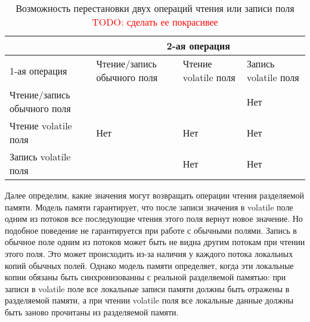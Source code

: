 \documentclass[14pt,titlepage]{extarticle}
\newcommand{\todo}[1]{\textcolor{red}{\eng{TODO}: #1}}
\newcommand{\eng}[1]{{\English#1}}
\begin{document}
      \begin{table}[!htb]
        \centering
        \begin{tabular}{ |p{}|p{}|p{}|p{}| }
          \hline
          & \multicolumn{3}{c|}{2-ая операция} \\ \hline
          1-ая операция & Чтение/запись обычного поля
                        & Чтение \eng{volatile} поля
                        & Запись \eng{volatile} поля \\ \hline
          Чтение/запись обычного поля &     &     & Нет \\ \hline
          Чтение \eng{volatile} поля  & Нет & Нет & Нет \\ \hline
          Запись \eng{volatile} поля  &     & Нет & Нет \\ \hline
        \end{tabular}
        \caption{Возможность перестановки двух операций чтения или записи поля
                 \todo{сделать ее покрасивее}}
        \label{tabular:can_reorder}
      \end{table}

      Далее определим, какие значения могут возвращать операции чтения
      разделяемой памяти. Модель памяти гарантирует, что после записи значения
      в \eng{volatile} поле одним из потоков все последующие чтения этого поля
      вернут новое значение. Но подобное поведение не гарантируется при работе
      с обычными полями. Запись в обычное поле одним из потоков может быть не
      видна другим потокам при чтении этого поля. Это может происходить из-за
      наличия у каждого потока локальных копий обычных полей.  Однако модель
      памяти определяет, когда эти локальные копии обязаны быть синхронизованны
      с реальной разделяемой памятью: при записи в \eng{volatile} поле все
      локальные записи памяти должны быть отражены в разделяемой памяти, а при
      чтении \eng{volatile} поля все локальные данные должны быть заново
      прочитаны из разделяемой памяти.
\end{document}
